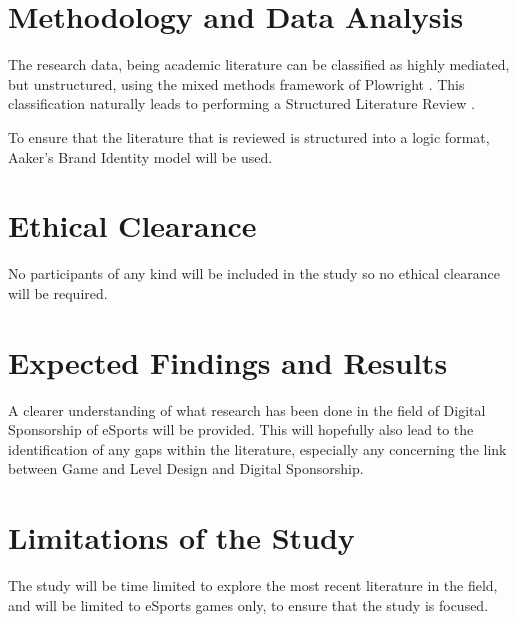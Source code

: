 \documentclass[10pt,twoside]{article}
\begin{document}
\section{Methodology and Data Analysis}

The research data, being academic literature can be classified as highly mediated, but unstructured, using the mixed methods framework of Plowright \cite{plowright2011using}. This classification naturally leads to performing a Structured Literature Review \cite{petticrew2008systematic}.

To ensure that the literature that is reviewed is structured into a logic format, Aaker's Brand Identity model will be used.

\section{Ethical Clearance}
No participants of any kind will be included in the study so no ethical clearance will be required.

\section{Expected Findings and Results}
A clearer understanding of what research has been done in the field of Digital Sponsorship of eSports will be provided. This will hopefully also lead to the identification of any gaps within the literature, especially any concerning the link between Game and Level Design and Digital Sponsorship.

\section{Limitations of the Study}
The study will be time limited to explore the most recent literature in the field, and will be limited to eSports games only, to ensure that the study is focused.



\end{document}
